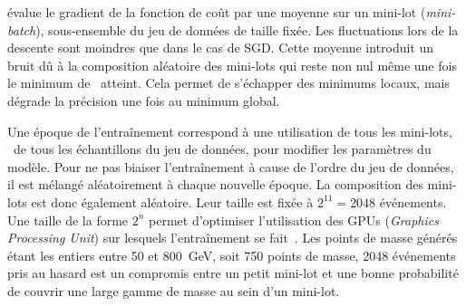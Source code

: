 évalue le gradient de la fonction de coût
par une moyenne
sur un \og mini-lot \fg{} (\emph{mini-batch}), sous-ensemble du jeu de données de taille fixée.
Les fluctuations lors de la descente sont moindres que dans le cas de SGD.
Cette moyenne introduit un bruit dû à la composition aléatoire des mini-lots
qui reste non nul même une fois le minimum de \Loss\ atteint.
Cela permet de s'échapper des minimums locaux, mais dégrade la précision une fois au minimum global.
\par
Une \og époque \fg{} de l'entraînement correspond à une utilisation de tous les mini-lots, \ie\ de tous les échantillons du jeu de données, pour modifier les paramètres du modèle.
Pour ne pas biaiser l'entraînement à cause de l'ordre du jeu de données,
il est mélangé aléatoirement à chaque nouvelle époque.
La composition des mini-lots est donc également aléatoire.
Leur taille est fixée à $2^{11}=\num{2048}$ événements.
Une taille de la forme $2^n$ permet d'optimiser l'utilisation des GPUs (\emph{Graphics Processing Unit}) sur lesquels l'entraînement se fait~\cite{DNN}.
Les points de masse générés étant les entiers entre \num{50} et \SI{800}{\GeV}, soit \num{750} points de masse,
\num{2048} événements pris au hasard est un compromis entre
un petit mini-lot
et
une bonne probabilité de couvrir une large gamme de masse au sein d'un mini-lot.
